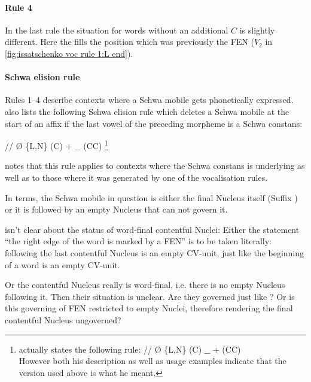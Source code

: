 \paragraph{Rule 4}
In the last rule the situation for words without an
additional $C$ is slightly different.
Here the \ti{/\textsce/} fills the position which
was previously the \gls{FEN} ($V_2$ in \cref{fig:issatschenko voc rule 1:L end}).

\paragraph{Schwa elision rule}
Rules 1--4 describe contexts where a Schwa mobile
gets phonetically expressed. \citeauthor{issatschenko1974}
also lists the following Schwa elision rule which deletes
a Schwa mobile at the start of an affix if the last
vowel of the preceding morpheme is a Schwa constans:

\deriv
  {/\schwaMobi/}    %
  {\O}              %
  {\schwaCons \{L,N\} (C) + $\_\_$ (CC)}%
\footnote{\Textcite{issatschenko1974} actually states the
  following rule:
  \deriv
    {/\schwaMobi/}    %
    {\O}              %
    {\schwaCons \{L,N\} (C) $\_\_$ + \schwaMobi (CC)}\\
  However both his description as well as usage examples
  indicate that the version used above is what he meant.
}

 notes that this rule
applies to contexts where the Schwa constans is underlying
as well as to those where it was generated by one of the
vocalisation rules.

In \CVCV terms, the Schwa mobile in question is either
the final Nucleus itself (Suffix ) or it is followed
by an empty Nucleus that can not govern it.

\Textcite{scheer2004} isn't clear about the status of
word-final contentful Nuclei:
Either the statement \enquote{the right edge of the word is
  marked by a \acrlong{FEN}} is to be taken
  literally: following the last contentful Nucleus is
  an empty CV-unit, just like the beginning of a word is
  an empty CV-unit.

Or the contentful Nucleus really is word-final,
i.e. there is no empty Nucleus following it.
Then their situation is unclear.
Are they governed just like ?
Or is this governing of \gls{FEN} restricted to empty
Nuclei, therefore rendering the final contentful Nucleus
ungoverned?

